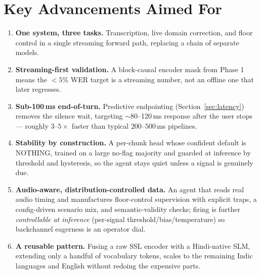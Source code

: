 \documentclass[11pt]{article}
\begin{document}
\section{Key Advancements Aimed For}
\begin{enumerate}[leftmargin=1.4em,itemsep=1pt]
\item \textbf{One system, three tasks.} Transcription, live domain correction, and floor
control in a single streaming forward path, replacing a chain of separate models.
\item \textbf{Streaming-first validation.} A block-causal encoder mask from Phase 1 means the
$<5\%$ WER target is a streaming number, not an offline one that later regresses.
\item \textbf{Sub-100\,ms end-of-turn.} Predictive endpointing (Section~\ref{sec:latency})
removes the silence wait, targeting $\sim$80--120\,ms response after the user stops --- roughly
$3$--$5\times$ faster than typical $200$--$500$\,ms pipelines.
\item \textbf{Stability by construction.} A per-chunk head whose confident default is NOTHING,
trained on a large no-flag majority and guarded at inference by threshold and hysteresis, so
the agent stays quiet unless a signal is genuinely due.
\item \textbf{Audio-aware, distribution-controlled data.} An agent that reads real audio
timing and manufactures floor-control supervision with explicit traps, a config-driven
scenario mix, and semantic-validity checks; firing is further \emph{controllable at inference}
(per-signal threshold/bias/temperature) so backchannel eagerness is an operator dial.
\item \textbf{A reusable pattern.} Fusing a raw SSL encoder with a Hindi-native SLM, extending
only a handful of vocabulary tokens, scales to the remaining Indic languages and English
without redoing the expensive parts.
\end{enumerate}
\end{document}
